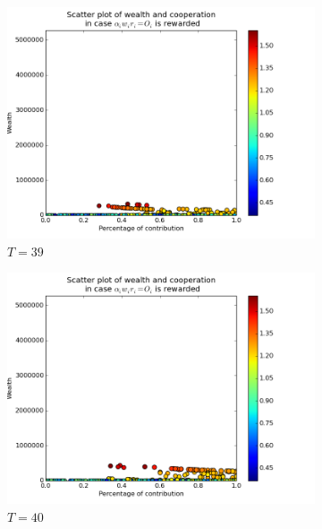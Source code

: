\documentclass{article}
\begin{document}
\begin{figure}[h]
\centering


\begin{subfigure}[t]{0.333\textwidth}
\centering
\includegraphics[width=\textwidth]{nq_output_scatter/scatter_ranking_1_039.png}
\caption{$T = 39$}
\end{subfigure}%
%
\hfill
%
\begin{subfigure}[t]{0.333\textwidth}
\centering
\includegraphics[width=\textwidth]{nq_output_scatter/scatter_ranking_1_040.png}
\caption{$T = 40$}
\end{subfigure}%
%
\hfill
%
\begin{subfigure}[t]{0.333\textwidth}

\end{subfigure}
\end{figure}
\end{document}
